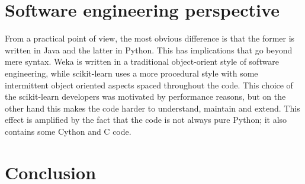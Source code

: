 \section{Software engineering perspective}
From a practical point of view, the most obvious difference is that the former is written in Java and the latter in Python. This has implications that go beyond mere syntax. Weka is written in a traditional object-orient style of software engineering, while scikit-learn uses a more procedural style with some intermittent object oriented aspects spaced throughout the code. This choice of the scikit-learn developers was motivated by performance reasons, but on the other hand this makes the code harder to understand, maintain and extend. This effect is amplified by the fact that the code is not always pure Python; it also contains some Cython and C code.

\section{Conclusion}
